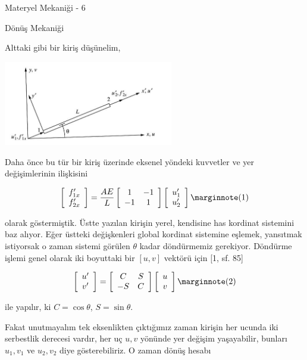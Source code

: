 \documentclass[12pt,fleqn]{article}\usepackage{../../common}
\begin{document}
Materyel Mekaniği - 6

Dönüş Mekaniği

Alttaki gibi bir kiriş düşünelim,

\includegraphics[width=20em]{phy_020_strs_06_01.jpg}

Daha önce bu tür bir kiriş üzerinde eksenel yöndeki kuvvetler ve yer
değişimlerinin ilişkisini

$$
\left[\begin{array}{c}
f'_{1x} \\ f'_{2x}
\end{array}\right] =
\frac{AE}{L}
\left[\begin{array}{cc}
1 & -1 \\ -1 & 1
\end{array}\right]
\left[\begin{array}{c}
u'_1 \\ u'_2
\end{array}\right]
\mlabel{1}
$$

olarak göstermiştik. Üstte yazılan kirişin yerel, kendisine has kordinat
sistemini baz alıyor. Eğer üstteki değişkenleri global kordinat sistemine
eşlemek, yansıtmak istiyorsak o zaman sistemi görülen $\theta$ kadar döndürmemiz
gerekiyor. Döndürme işlemi genel olarak iki boyuttaki bir $[u, v]$ vektörü için
[1, sf. 85]

$$
\left[\begin{array}{c}
u' \\ v'
\end{array}\right] =
\left[\begin{array}{cc}
C & S \\ -S & C
\end{array}\right]
\left[\begin{array}{c}
u \\ v
\end{array}\right]
\mlabel{2}
$$

ile yapılır, ki $C = \cos\theta$, $S = \sin\theta$.

Fakat unutmayalım tek eksenlikten çıktığımız zaman kirişin her ucunda iki
serbestlik derecesi vardır, her uç $u,v$ yönünde yer değişim yaşayabilir,
bunları $u_1,v_1$ ve $u_2,v_2$ diye gösterebiliriz. O zaman dönüş hesabı
\end{document}
